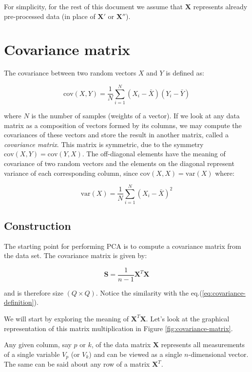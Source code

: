 \documentclass[10pt,twocolumn]{article}
\begin{document}
For simplicity, for the rest of this document we assume that $\bm{X}$ represents already pre-processed data (in place of $\bm{X'}$ or $\bm{X''}$).

\section{Covariance matrix}

The covariance between two random vectors $X$ and $Y$ is defined as:

\begin{equation}\label{eq:covariance-definition}
\text{cov}(X,Y) = \frac{1}{N} \sum_{i=1}^{N} (X_i - \bar{X}) (Y_i - \bar{Y})
\end{equation}

where $N$ is the number of samples (weights of a vector). If we look at any data matrix as a composition of vectors formed by its columns, we may compute the covariances of these vectors and store the result in another matrix, called a \textit{covariance matrix}. This matrix is symmetric, due to the symmetry $\text{cov}(X,Y) = \text{cov}(Y,X)$. The off-diagonal elements have the meaning of covariance of two random vectors and the elements on the diagonal represent variance of each corresponding column, since $\text{cov}(X,X) = \text{var}(X)$ where:

\begin{equation}\label{eq:variance-definition}
\text{var}(X) = \frac{1}{N} \sum_{i=1}^{N} (X_i - \bar{X})^2
\end{equation}

\subsection{Construction}

The starting point for performing PCA is to compute a covariance matrix from the data set. The covariance matrix is given by:

\begin{equation}\label{eq:cov-matrix}
\bm{S} = \frac{1}{n-1} \bm{X}^T \bm{X}
\end{equation}

and is therefore size $(Q \times Q)$. Notice the similarity with the eq.(\ref{eq:covariance-definition}).

We will start by exploring the meaning of $\bm{X}^T \bm{X}$. Let's look at the graphical representation of this matrix multiplication in Figure \ref{fig:covariance-matrix}.

Any given column, say $p$ or $k$, of the data matrix $\bm{X}$ represents all measurements of a single variable $V_p$ (or $V_k$) and can be viewed as a single $n$-dimensional vector. The same can be said about any row of a matrix $\bm{X}^T$.
\end{document}
